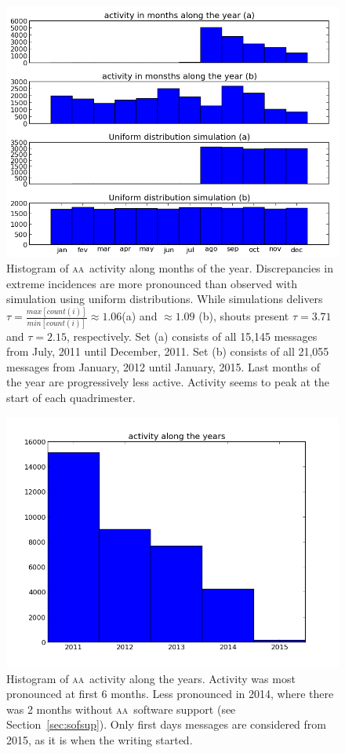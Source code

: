 \documentclass[a4paper, 11pt]{article} %
\newcommand{\aab}{\textsc{aa}}
\begin{document}
\begin{figure}[H]
    \hspace{-25mm}
    \includegraphics[width=1.3\textwidth]{imgs/monthsHist}
    \caption{\small Histogram of \aab\ activity along months of the year. Discrepancies in extreme incidences are more pronounced than observed with simulation using uniform distributions. While simulations delivers $\tau=\frac{max[count(i)]}{min[count(i)]}\approx1.06$(a) and $\approx 1.09$ (b), shouts present $\tau=3.71$ and $\tau=2.15$, respectively. Set (a) consists of all 15,145 messages from July, 2011 until December, 2011. Set (b) consists of all 21,055 messages from January, 2012 until January, 2015. Last months of the year are progressively less active. Activity seems to peak at the start of each quadrimester.}\label{fig:histMonth}
\end{figure}


\begin{figure}[H]
    \hspace{-25mm}
    \includegraphics[width=1.3\textwidth]{imgs/yearHist}
    \caption{\small Histogram of \aab\ activity along the years. Activity was most pronounced at first 6 months. Less pronounced in 2014, where there was 2 months without \aab\ software support (see Section~\ref{sec:sofsup}). Only first days messages are considered from 2015, as it is when the writing started.}\label{fig:histMonth}
\end{figure}
\end{document}
